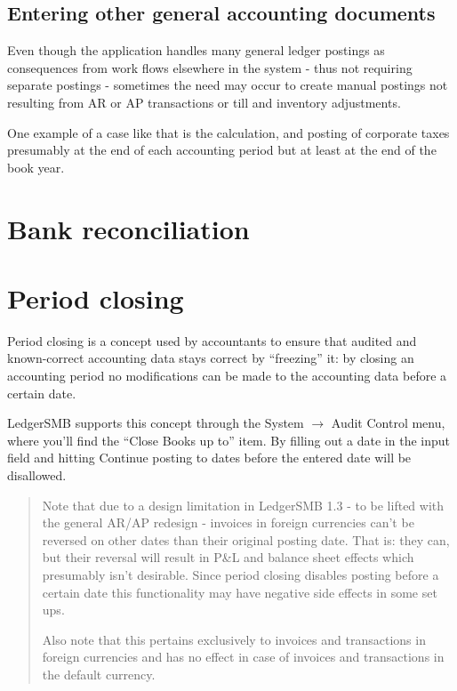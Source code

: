 \subsection{Entering other general accounting documents}
\label{subsec-workflows-accounting-entry-others}

Even though the application handles many general ledger postings as consequences
from work flows elsewhere in the system - thus not requiring separate postings -
sometimes the need may occur to create manual postings not resulting from
AR or AP transactions or till and inventory adjustments.

One example of a case like that is the calculation, and posting of
corporate taxes presumably at the end of each accounting period but at least
at the end of the book year.



\section{Bank reconciliation}
\label{sec-workflows-accounting-reconciliation}



\section{Period closing}
\label{sec-workflows-accounting-period-closing}

Period closing is a concept used by accountants to ensure that audited and
known-correct accounting data stays correct by ``freezing'' it: by closing
an accounting period no modifications can be made to the accounting data
before a certain date.

LedgerSMB supports this concept through the System $\rightarrow$ Audit Control
menu, where you'll find the ``Close Books up to'' item. By filling out a date
in the input field and hitting Continue posting to dates before the entered
date will be disallowed.


\begin{quotation}
Note that due to a design limitation in LedgerSMB 1.3 - to be lifted with the
general AR/AP redesign - invoices in foreign currencies can't be reversed on
other dates than their original posting date. That is: they can, but their
reversal will result in P\&L and balance sheet effects which presumably isn't
desirable. Since period closing disables posting before a certain date this
functionality may have negative side effects in some set ups.

Also note that this pertains exclusively to invoices and transactions in foreign
currencies and has no effect in case of invoices and transactions in the default
currency.
\end{quotation}

